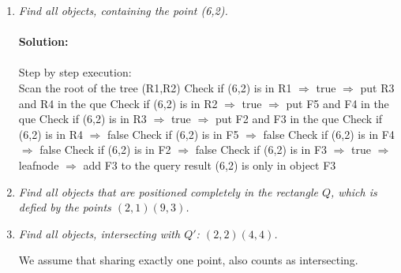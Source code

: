 \begin{enumerate}
\begin{center}
    \end{center}
\item
  {\em Find all objects, containing the point (6,2).}\\\\
  {\bf Solution:}\\\\
  Step by step execution:\\
  \subitem
  Scan the root of the tree (R1,R2)
  \subitem
  Check if (6,2) is in R1 $\Rightarrow$ true $\Rightarrow$ put R3 and R4 in the que
  \subitem
  Check if (6,2) is in R2 $\Rightarrow$ true $\Rightarrow$ put F5 and F4 in the que
  \subitem
  Check if (6,2) is in R3 $\Rightarrow$ true $\Rightarrow$ put F2 and F3 in the que
  \subitem
  Check if (6,2) is in R4 $\Rightarrow$ false
  \subitem
  Check if (6,2) is in F5 $\Rightarrow$ false
  \subitem
  Check if (6,2) is in F4 $\Rightarrow$ false
  \subitem
  Check if (6,2) is in F2 $\Rightarrow$ false
  \subitem
  Check if (6,2) is in F3 $\Rightarrow$ true $\Rightarrow$ leafnode $\Rightarrow$ add F3 to the query result
  \subitem
  (6,2) is only in object F3

\item
{\em Find all objects that are positioned completely in the rectangle $Q$, which is defied by the points $(2, 1) (9, 3)$.}

\item
  {\em Find all objects, intersecting with $Q'$: $(2,2) (4,4)$.}

  We assume that sharing exactly one point, also counts as intersecting.

\end{enumerate}


